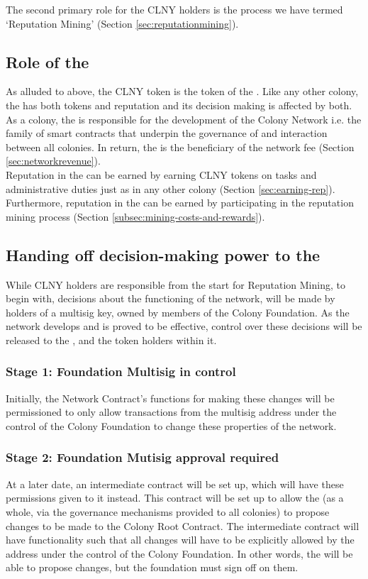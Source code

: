 The second primary role for the CLNY holders is the process we have termed `Reputation Mining' (Section \ref{sec:reputationmining}).

\subsection{Role of the \rc}
As alluded to above, the CLNY token is the token of the \rc. Like any other colony, the \rc has both tokens and reputation and its decision making is affected by both.\\
As a colony, the \rc is responsible for the development of the Colony Network i.e. the family of smart contracts that underpin the governance of and interaction between all colonies. In return, the \rc is the beneficiary of the network fee (Section \ref{sec:networkrevenue}).\\
Reputation in the \rc can be earned by earning CLNY tokens on tasks and administrative duties just as in any other colony (Section \ref{sec:earning-rep}). Furthermore, reputation in the \rc can be earned by participating in the reputation mining process (Section \ref{subsec:mining-costs-and-rewards}).

\subsection{Handing off decision-making power to the \rc}\label{subsec:ceding-control-to-rc}
While CLNY holders are responsible from the start for Reputation Mining, to begin with, decisions about the functioning of the network, will be made by holders of a multisig key, owned by members of the Colony Foundation. As the network develops and is proved to be effective, control over these decisions will be released to the \rc, and the token holders within it.

\subsubsection*{Stage 1: Foundation Multisig in control}
Initially, the Network Contract's functions for making these changes will be permissioned to only allow transactions from the multisig address under the control of the Colony Foundation to change these properties of the network. 

\subsubsection*{Stage 2: Foundation Mutisig approval required}
At a later date, an intermediate contract will be set up, which will have these permissions given to it instead. This contract will be set up to allow the \rc (as a whole, via the governance mechanisms provided to all colonies) to propose changes to be made to the Colony Root Contract. The intermediate contract will have functionality such that all changes will have to be explicitly allowed by the address under the control of the Colony Foundation. In other words, the \rc will be able to propose changes, but the foundation must sign off on them.

